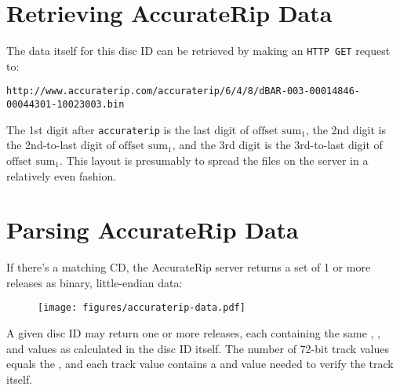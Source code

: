 \section{Retrieving AccurateRip Data}
The data itself for this disc ID can be retrieved by making an
\texttt{HTTP GET} request to:
{
\begin{Verbatim}[frame=single]
  http://www.accuraterip.com/accuraterip/6/4/8/dBAR-003-00014846-00044301-10023003.bin
\end{Verbatim}
}
\par
\noindent
The 1st digit after \texttt{accuraterip} is the last digit of
$\text{offset sum}_1$,
the 2nd digit is the 2nd-to-last digit of $\text{offset sum}_1$,
and the 3rd digit is the 3rd-to-last digit of $\text{offset sum}_1$.
This layout is presumably to spread the files on the server
in a relatively even fashion.

\clearpage

\section{Parsing AccurateRip Data}
If there's a matching CD, the AccurateRip server
returns a set of 1 or more releases as binary, little-endian data:
\begin{figure}[h]
  \texttt{[image: figures/accuraterip-data.pdf]}
\end{figure}
\par
\noindent
A given disc ID may return one or more releases,
each containing the same , ,
 and  values
as calculated in the disc ID itself.
The number of 72-bit track values equals the ,
and each track value contains a  and 
value needed to verify the track itself.

